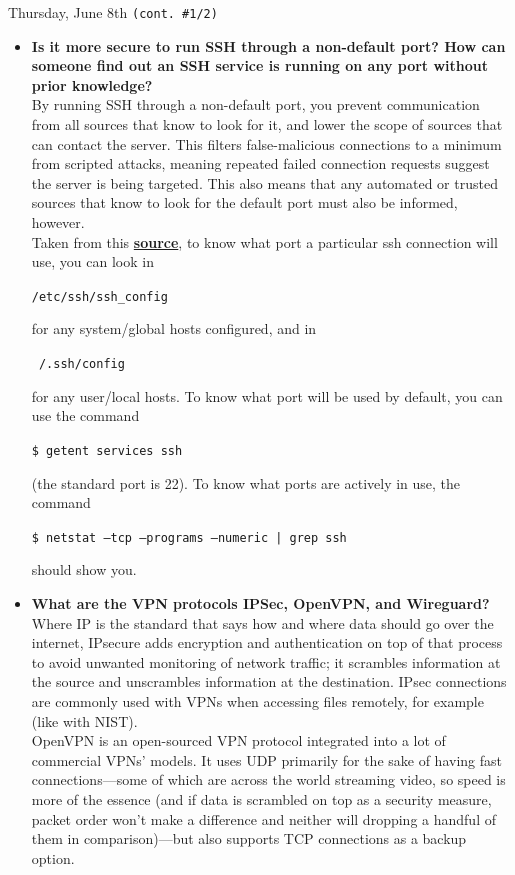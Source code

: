 \documentclass[11pt]{article}
\newcommand\codebox[1]{
    \noindent\hspace{-0.25em}\begin{tcolorbox}[on line, hbox, colback = codeblack, colframe = codeborder, coltext = white, boxrule = 1.5pt, left = 2pt, right = 2pt, top = 0.5pt, bottom = 0.5pt]
    \small\texttt{#1}\normalsize
    \end{tcolorbox}\hspace{-0.25em}
}
\begin{document}
\begin{orangebox}{Thursday, June 8th \hspace{0.2cm}\texttt{(cont. \#1/2)}\vspace{-2.2em}\begin{flushright}\end{flushright}}
    \begin{itemize}
        \item\textbf{Is it more secure to run SSH through a non-default port? How can someone find out an SSH service is running on any port without prior knowledge?} \\
        \phantom{~~~~} By running SSH through a non-default port, you prevent communication from all sources that know to look for it, and lower the scope of sources that can contact the server. This filters false-malicious connections to a minimum from scripted attacks, meaning repeated failed connection requests suggest the server is being targeted. This also means that any automated or trusted sources that know to look for the default port must also be informed, however. \\
        \phantom{~~~~} Taken from this \href{https://unix.stackexchange.com/questions/539882/find-which-port-does-ssh-client-used-to-send-connection-request}{\textbf{source}}, to know what port a particular ssh connection will use, you can look in \codebox{/etc/ssh/ssh\_config} for any system/global hosts configured, and in \codebox{~/.ssh/config} for any user/local hosts. To know what port will be used by default, you can use the command \codebox{\$ getent services ssh} (the standard port is 22). To know what ports are actively in use, the command \codebox{\$ netstat --tcp --programs --numeric | grep ssh} should show you.
        \item\textbf{What are the VPN protocols IPSec, OpenVPN, and Wireguard?} \\
        \phantom{~~~~} Where IP is the standard that says how and where data should go over the internet, IPsecure adds encryption and authentication on top of that process to avoid unwanted monitoring of network traffic; it scrambles information at the source and unscrambles information at the destination. IPsec connections are commonly used with VPNs when accessing files remotely, for example (like with NIST). \\
        \phantom{~~~~} OpenVPN is an open-sourced VPN protocol integrated into a lot of commercial VPNs' models. It uses UDP primarily for the sake of having fast connections---some of which are across the world streaming video, so speed is more of the essence (and if data is scrambled on top as a security measure, packet order won't make a difference and neither will dropping a handful of them in comparison)---but also supports TCP connections as a backup option. \\

\end{itemize}
\end{orangebox}
\end{document}
